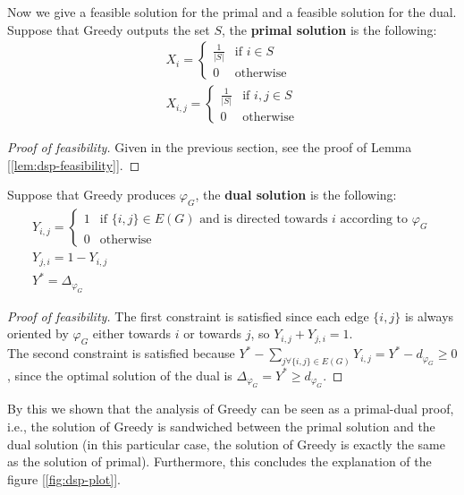 Now we give a feasible solution for the primal and a feasible solution for the dual.\\
Suppose that Greedy outputs the set $S$, the \textbf{primal solution} is the following:
\begin{equation}
    \begin{aligned}
    &X_i =
    \begin{cases}
        \frac{1}{|S|} & \text{if } i \in S\\
        0             & \text{otherwise}
    \end{cases}&\\
    &X_{i,j} =
    \begin{cases}
        \frac{1}{|S|} & \text{if } i,j \in S\\
        0             & \text{otherwise}
    \end{cases}&
    \end{aligned}
\end{equation}
\begin{proof}[Proof of feasibility]
    Given in the previous section, see the proof of Lemma [\ref{lem:dsp-feasibility}].
\end{proof}
Suppose that Greedy produces $\varphi_G$, the \textbf{dual solution} is the following:
\begin{equation}
    \begin{aligned}
        &Y_{i,j} =
        \begin{cases}
            1 & \text{if } \{i,j\} \in E(G) \text{ and is directed towards } i \text{ according to } \varphi_G\\
            0 & \text{otherwise}
        \end{cases}&\\
        &Y_{j,i} = 1 - Y_{i,j}&\\
        &Y^* = \Delta_{\varphi_G}&
    \end{aligned}
\end{equation}
\begin{proof}[Proof of feasibility]
    The first constraint is satisfied since each edge $\{i,j\}$ is always oriented by $\varphi_G$ either towards $i$ or towards $j$, so $Y_{i,j} + Y_{j,i} = 1$.\\
    The second constraint is satisfied because $Y^* - \sum_{j \forall \{i,j\} \in E(G)} Y_{i, j} = Y^* - d_{\varphi_G} \geq 0$, since the optimal solution of the dual is $\Delta_{\varphi_G} = Y^* \geq d_{\varphi_G}$.
\end{proof}

By this we shown that the analysis of Greedy can be seen as a primal-dual proof, i.e., the solution of Greedy is sandwiched between the primal solution and the dual solution (in this particular case, the solution of Greedy is exactly the same as the solution of primal). Furthermore, this concludes the explanation of the figure [\ref{fig:dsp-plot}].


